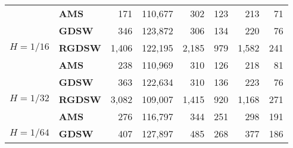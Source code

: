 \begin{table}[H]
\begin{tabular}{llrrrrrr}
\cline{2-8}
\bfseries  & \bfseries AMS & 171 & {\cellcolor[HTML]{E2E4FB}} \color[HTML]{000000} 110,677 & {\cellcolor[HTML]{ACB8F4}} \color[HTML]{000000} 302 & {\cellcolor[HTML]{768BEC}} \color[HTML]{F1F1F1} 123 & {\cellcolor[HTML]{405FE5}} \color[HTML]{F1F1F1} 213 & 71 \\
\cline{1-8} \cline{2-8}
\multirow[c]{3}{*}{\bfseries $H=1/16$} & \bfseries GDSW & 346 & {\cellcolor[HTML]{E2E4FB}} \color[HTML]{000000} 123,872 & {\cellcolor[HTML]{405FE5}} \color[HTML]{F1F1F1} 306 & {\cellcolor[HTML]{ACB8F4}} \color[HTML]{000000} 134 & {\cellcolor[HTML]{768BEC}} \color[HTML]{F1F1F1} 220 & 76 \\
\cline{2-8}
\bfseries  & \bfseries RGDSW & 1,406 & {\cellcolor[HTML]{E2E4FB}} \color[HTML]{000000} 122,195 & {\cellcolor[HTML]{ACB8F4}} \color[HTML]{000000} 2,185 & {\cellcolor[HTML]{768BEC}} \color[HTML]{F1F1F1} 979 & {\cellcolor[HTML]{405FE5}} \color[HTML]{F1F1F1} 1,582 & 241 \\
\cline{2-8}
\bfseries  & \bfseries AMS & 238 & {\cellcolor[HTML]{E2E4FB}} \color[HTML]{000000} 110,969 & {\cellcolor[HTML]{768BEC}} \color[HTML]{F1F1F1} 310 & {\cellcolor[HTML]{ACB8F4}} \color[HTML]{000000} 126 & {\cellcolor[HTML]{405FE5}} \color[HTML]{F1F1F1} 218 & 81 \\
\cline{1-8} \cline{2-8}
\multirow[c]{3}{*}{\bfseries $H=1/32$} & \bfseries GDSW & 363 & {\cellcolor[HTML]{E2E4FB}} \color[HTML]{000000} 122,634 & {\cellcolor[HTML]{405FE5}} \color[HTML]{F1F1F1} 310 & {\cellcolor[HTML]{ACB8F4}} \color[HTML]{000000} 136 & {\cellcolor[HTML]{768BEC}} \color[HTML]{F1F1F1} 223 & 76 \\
\cline{2-8}
\bfseries  & \bfseries RGDSW & 3,082 & {\cellcolor[HTML]{E2E4FB}} \color[HTML]{000000} 109,007 & {\cellcolor[HTML]{405FE5}} \color[HTML]{F1F1F1} 1,415 & {\cellcolor[HTML]{ACB8F4}} \color[HTML]{000000} 920 & {\cellcolor[HTML]{768BEC}} \color[HTML]{F1F1F1} 1,168 & 271 \\
\cline{2-8}
\bfseries  & \bfseries AMS & 276 & {\cellcolor[HTML]{E2E4FB}} \color[HTML]{000000} 116,797 & {\cellcolor[HTML]{ACB8F4}} \color[HTML]{000000} 344 & {\cellcolor[HTML]{768BEC}} \color[HTML]{F1F1F1} 251 & {\cellcolor[HTML]{405FE5}} \color[HTML]{F1F1F1} 298 & 191 \\
\cline{1-8} \cline{2-8}
\multirow[c]{3}{*}{\bfseries $H=1/64$} & \bfseries GDSW & 407 & {\cellcolor[HTML]{E2E4FB}} \color[HTML]{000000} 127,897 & {\cellcolor[HTML]{768BEC}} \color[HTML]{F1F1F1} 485 & {\cellcolor[HTML]{ACB8F4}} \color[HTML]{000000} 268 & {\cellcolor[HTML]{405FE5}} \color[HTML]{F1F1F1} 377 & 186 \\

\end{tabular}
\end{table}
